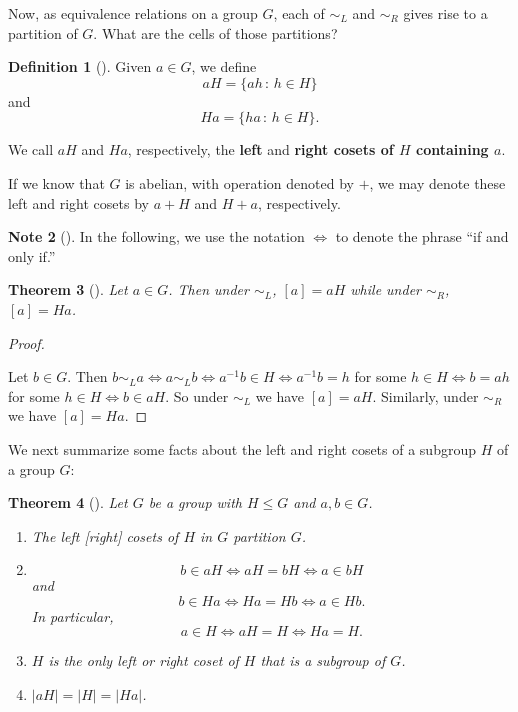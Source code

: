 \documentclass[10pt,openany,oneside]{book}
\newcommand{\terminology}[1]{\textbf{#1}}
\theoremstyle{plain}
\newtheorem{theorem}{Theorem}[section]
\theoremstyle{definition}
\newtheorem{definition}[theorem]{Definition}
\theoremstyle{definition}
\newtheorem{note}[theorem]{Note}
\theoremstyle{definition}
\theoremstyle{definition}
\numberwithin{equation}{section}
\def\siml{\sim_L}
\def\simr{\sim_R}
\begin{document}
\par
Now, as equivalence relations on a group \(G\), each of \(\siml\) and \(\simr\) gives rise to a partition of \(G\). What are the cells of those partitions?%
\begin{definition}[{}]\label{definition-60}
\label{notation-68}
\label{notation-69}
Given \(a\in G\), we define%
\begin{equation*}
aH =
\{ah\,:\, h\in H\}
\end{equation*}
and%
\begin{equation*}
Ha=\{ha\,:\,h\in H\}.
\end{equation*}
%
\par
We call \(aH\) and \(Ha\), respectively, the \terminology{left} and \terminology{right cosets of \(H\) containing \(a\)}.%
\par
If we know that \(G\) is abelian, with operation denoted by \(+\), we may denote these left and right cosets by \(a+H\) and \(H+a\), respectively.%
\end{definition}
\begin{note}[]\label{note-8}
\label{notation-70}
 In the following, we use the notation \(\Leftrightarrow\) to denote the phrase ``if and only if.''%
\end{note}
\begin{theorem}[{}]\label{equivca}
Let \(a\in G\). Then under \(\siml\), \([a]=aH\) while under \(\simr\), \([a]=Ha\).%
\end{theorem}
\begin{proof}\hypertarget{proof-36}{}
Let \(b\in G\). Then \(b\siml a \Leftrightarrow a \siml b
\Leftrightarrow a^{-1}b\in H \Leftrightarrow a^{-1}b=h\) for some \(h\in H \Leftrightarrow b=ah\) for some \(h\in H \Leftrightarrow b\in
aH\). So under \(\siml\) we have \([a]=aH\). Similarly, under \(\simr\) we have \([a]=Ha\).%
\end{proof}
We next summarize some facts about the left and right cosets of a subgroup \(H\) of a group \(G\):%
\begin{theorem}[{}]\label{cosetfacts}
Let \(G\) be a group with \(H\leq G\) and \(a,b\in G\). \leavevmode%
\begin{enumerate}
\item\hypertarget{li-408}{}The left [right] cosets of \(H\) in \(G\) partition \(G\).%
\item\hypertarget{li-409}{}%
\begin{equation*}
b\in aH \Leftrightarrow aH=bH \Leftrightarrow  a\in bH
\end{equation*}
and%
\begin{equation*}
b\in Ha \Leftrightarrow  Ha=Hb \Leftrightarrow  a\in
Hb.
\end{equation*}
In particular,%
\begin{equation*}
a\in H \Leftrightarrow aH=H \Leftrightarrow Ha=H.
\end{equation*}
%
\item\hypertarget{li-410}{}\(H\) is the only left or right coset of \(H\) that is a \emph{subgroup} of \(G\).%
\item\hypertarget{li-411}{}\(|aH|=|H|=|Ha|\).%
\end{enumerate}
%
\end{theorem}
\end{document}

